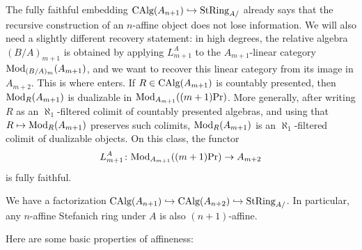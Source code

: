 \documentclass[11pt]{book}
\begin{document}
	The fully faithful embedding ${\textup{CAlg}}(A_{n+1}) \hookrightarrow {\textup{StRing}}_{A/}$ already says that the recursive construction of an $n$-affine object does not lose information. We will also need a slightly different recovery statement: in high degrees, the relative algebra $(B/A)_{m+1}$ is obtained by applying $L^A_{m+1}$ to the $A_{m+1}$-linear category ${\textup{Mod}}_{(B/A)_m}(A_{m+1})$, and we want to recover this linear category from its image in $A_{m+2}$. This is where  enters. If $R \in {\textup{CAlg}}(A_{m+1})$ is countably presented, then ${\textup{Mod}}_R(A_{m+1})$ is dualizable in ${\textup{Mod}}_{A_{m+1}}((m+1)\textup{Pr})$. More generally, after writing $R$ as an $\aleph_1$-filtered colimit of countably presented algebras, and using that $R \mapsto {\textup{Mod}}_R(A_{m+1})$ preserves such colimits, ${\textup{Mod}}_R(A_{m+1})$ is an $\aleph_1$-filtered colimit of dualizable objects. On this class, the functor
	\[
		L^A_{m+1}\colon {\textup{Mod}}_{A_{m+1}}((m+1)\textup{Pr}) \to A_{m+2}
	\]
	is fully faithful.

	\begin{remark}
		We have a factorization ${\textup{CAlg}}(A_{n+1}) \hookrightarrow {\textup{CAlg}}(A_{n+2}) \hookrightarrow {\textup{StRing}}_{A/}$. In particular, any $n$-affine Stefanich ring under $A$ is also $(n+1)$-affine.
	\end{remark}

	Here are some basic properties of affineness:
\end{document}
